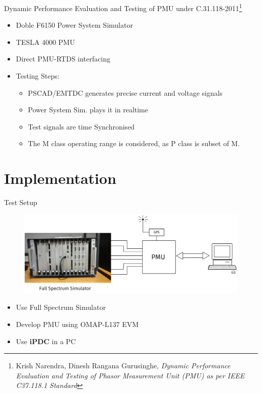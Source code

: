 \documentclass{beamer}
\begin{document}
\begin{frame}{\small{Dynamic Performance Evaluation and Testing of PMU under C.31.118-2011}\footnote{\tiny Krish Narendra, Dinesh Rangana Gurusinghe, \textit{Dynamic Performance Evaluation and Testing of Phasor Measurement Unit (PMU) as per IEEE C37.118.1 Standard}}}
\begin{itemize}
\item Doble F6150 Power System Simulator
\item TESLA 4000 PMU
\item Direct PMU-RTDS interfacing
\item Testing Steps:
\begin{itemize}
	\item PSCAD/EMTDC generates precise current and voltage signals
	\item Power System Sim. plays it in realtime
	\item Test signals are time Synchronised
	\item The M class operating range is considered, as P class is subset of M. 
\end{itemize}
\end{itemize}
\end{frame}

\section{Implementation}
\begin{frame}{Test Setup}
\begin{figure}
\includegraphics[width=\textwidth]{Test_setup.png}
\end{figure}
\begin{itemize}
\item Use Full Spectrum Simulator 
\item Develop PMU using OMAP-L137 EVM
\item Use \textbf{iPDC} in a PC
\end{itemize}
\end{frame}
\end{document}
